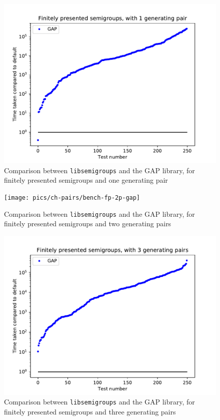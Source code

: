 \begin{figure}[h]
  \centering
  \includegraphics[width=\textwidth]{pics/ch-pairs/bench-fp-1p-gap}
  \caption{Comparison between \texttt{libsemigroups} and the GAP library, for
    finitely presented semigroups and one generating pair}
  \label{fig:bench-fp-1p-gap}
\end{figure}

\begin{figure}[h]
  \centering
  \texttt{[image: pics/ch-pairs/bench-fp-2p-gap]}
  \caption{Comparison between \texttt{libsemigroups} and the GAP library, for
    finitely presented semigroups and two generating pairs}
  \label{fig:bench-fp-2p-gap}
\end{figure}

\begin{figure}[h]
  \centering
  \includegraphics[width=\textwidth]{pics/ch-pairs/bench-fp-3p-gap}
  \caption{Comparison between \texttt{libsemigroups} and the GAP library, for
    finitely presented semigroups and three generating pairs}
  \label{fig:bench-fp-3p-gap}
\end{figure}

